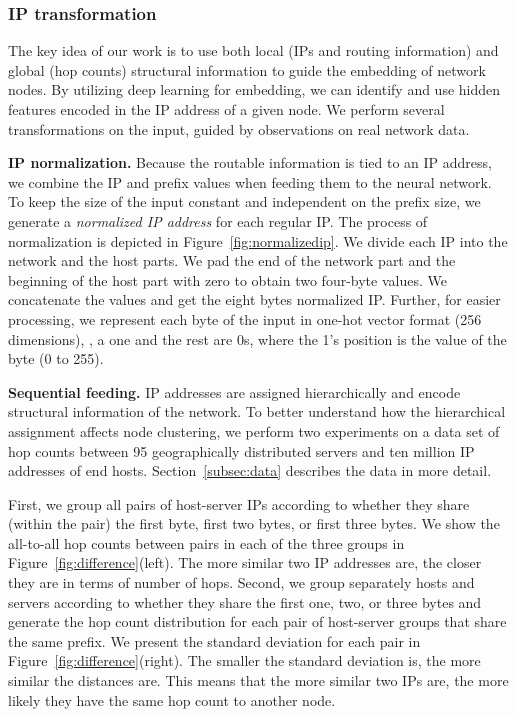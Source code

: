 \subsubsection{IP transformation}
\label{dip:ipnorm}

The key idea of our work is to use both local (IPs and routing information) and global (hop counts) structural information to guide the embedding of network nodes. By utilizing deep learning for embedding, we can identify and use hidden features encoded in the IP address of a given node. We perform several transformations on the input, guided by observations on real network data.

\textbf{IP normalization.} Because the routable information is tied to an IP address, we combine the IP and prefix values when feeding them to the neural network. To keep the size of the input constant and independent on the prefix size, we generate a {\em normalized IP address} for each regular IP. The process of normalization is depicted in Figure~\ref{fig:normalizedip}. We divide each IP into the network and the host parts. We pad the end of the network part and the beginning of the host part with zero to obtain two four-byte values. We concatenate the values and get the eight bytes normalized IP. Further, for easier processing, we represent each byte of the input in one-hot vector format (256 dimensions), \eg{}, a one and the rest are 0s, where the 1's position is the value of the byte (0 to 255).

\textbf{Sequential feeding.}  IP addresses are assigned hierarchically and encode structural information of the network. To better understand how the hierarchical assignment affects node clustering, we perform two experiments on a data set of hop counts between 95 geographically distributed servers and ten million IP addresses of end hosts. Section~\ref{subsec:data} describes the data in more detail.

First, we group all pairs of host-server IPs according to whether they share (within the pair) the first byte, first two bytes, or first three bytes. We show the all-to-all hop counts between pairs in each of the three groups in Figure~\ref{fig:difference}(left). The more similar two IP addresses are, the closer they are in terms of number of hops. 
%
Second, we group separately hosts and servers according to whether they share the first one, two, or three bytes and generate the hop count distribution for each pair of host-server groups that share the same prefix. We present the standard deviation for each pair in 
Figure~\ref{fig:difference}(right). The smaller the standard deviation is, the more similar the distances are. This means that the more similar two IPs are, the more likely they have the same hop count to another node. 






